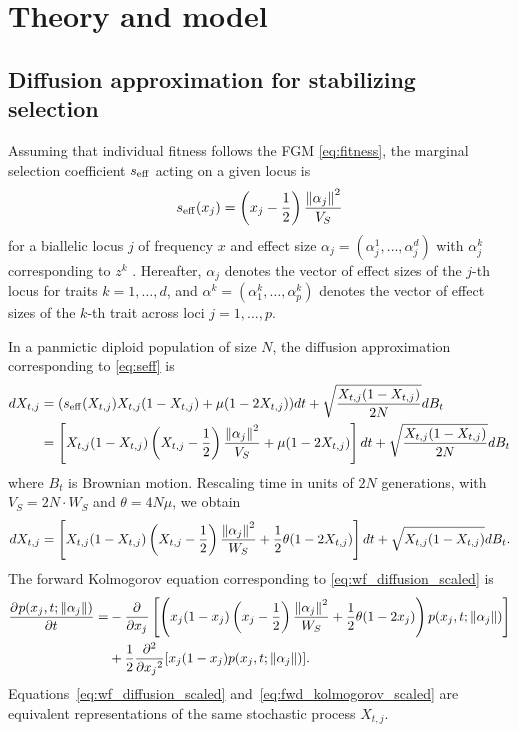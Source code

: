 \documentclass[10pt]{article}
\begin{document}
\section{Theory and model}

\subsection{Diffusion approximation for stabilizing selection}
Assuming that individual fitness follows the FGM \eqref{eq:fitness},
the marginal selection coefficient $\seff$ acting on a given locus is
\begin{align} \label{eq:seff}
    \seff(x_j) = \left(x_j-\frac{1}{2}\right)\frac{\norm{\alpha_j}^2}{V_S}
\end{align}
for a biallelic locus $j$ of frequency $x$ and effect size $\alpha_j=(\alpha_j^1, \ldots, \alpha_j^d)$ with $\alpha_j^k$ corresponding to $z^k$ \citep{Robertson1956againstextreme,Lande1976phenoevolution,Simons2018popgeninterpretation, Negm_2026}.
Hereafter, $\alpha_j$ denotes the vector of effect sizes of the $j$-th locus for traits $k=1,\ldots,d$, and $\alpha^k=(\alpha_1^k, \ldots, \alpha_p^k)$ denotes the vector of effect sizes of the $k$-th trait across loci $j=1, \ldots, p$.

In a panmictic diploid population of size $N$,
the diffusion approximation corresponding to \eqref{eq:seff} is
\begin{align} \label{eq:wf_diffusion_raw}
    \begin{aligned}
    dX_{t,j} &= (\seff(X_{t,j})X_{t,j}(1-X_{t,j}) + \mu(1-2X_{t,j}))dt + \sqrt{\frac{X_{t,j}(1-X_{t,j})}{2N}}dB_t \\
    &= \left[ X_{t,j}(1-X_{t,j})\left(X_{t,j}-\frac{1}{2}\right)\frac{\norm{\alpha_j}^2}{V_S}
    + \mu(1-2X_{t,j}) 
    \right] 
    dt + \sqrt{\frac{X_{t,j}(1-X_{t,j})}{2N}}dB_t
    \end{aligned}
\end{align}
where $B_t$ is Brownian motion.
Rescaling time in units of $2N$ generations, with $V_S = 2N \cdot W_S$ and $\theta = 4N\mu$, we obtain
\begin{align} \label{eq:wf_diffusion_scaled}
    dX_{t,j} = \left[
    X_{t,j}(1-X_{t,j})\left(X_{t,j}-\frac{1}{2}\right)\frac{\norm{\alpha_j}^2}{W_S} 
    + \frac{1}{2}\theta(1-2X_{t,j})
    \right] 
    dt + \sqrt{X_{t,j}(1-X_{t,j})}dB_t.
\end{align}
The forward Kolmogorov equation corresponding to \eqref{eq:wf_diffusion_scaled} is
\begin{align} \label{eq:fwd_kolmogorov_scaled}
    \begin{aligned}
     \pard{p(x_j,t;\norm{\alpha_j})}{t} 
     =& -\pard{}{x_j} 
     \left[
     \left(
        x_j(1-x_j)\left(x_j-\frac{1}{2}\right)
        \frac{\norm{\alpha_j}^2}{W_S}
        + \frac{1}{2}\theta(1-2x_j)
        \right)
        p(x_j,t;\norm{\alpha_j})
     \right] \\
     &+\frac{1}{2} \pard[2]{}{x_j}[x_j(1-x_j)p(x_j,t;\norm{\alpha_j})].
     \end{aligned}
\end{align}
Equations~\eqref{eq:wf_diffusion_scaled} and~\eqref{eq:fwd_kolmogorov_scaled} are equivalent representations of the same stochastic process $X_{t,j}$.
\end{document}
